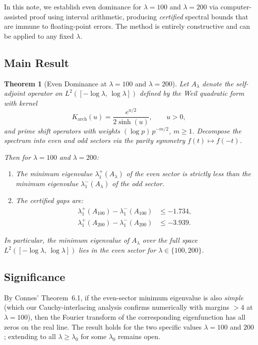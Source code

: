 \documentclass[12pt,a4paper]{article}
\newtheorem{theorem}{Theorem}[section]
\theoremstyle{definition}
\theoremstyle{remark}
\begin{document}
In this note, we establish even dominance for $\lambda = 100$ and $\lambda = 200$ via computer-assisted proof using interval arithmetic, producing \emph{certified} spectral bounds that are immune to floating-point errors. The method is entirely constructive and can be applied to any fixed $\lambda$.

\subsection{Main Result}

\begin{theorem}[Even Dominance at $\lambda = 100$ and $\lambda = 200$]
\label{thm:main}
Let $A_\lambda$ denote the self-adjoint operator on $L^2([-\log\lambda,\,\log\lambda])$ defined by the Weil quadratic form with kernel
\[
  K_{\mathrm{arch}}(u) = \frac{e^{u/2}}{2\sinh(u)}, \qquad u > 0,
\]
and prime shift operators with weights $(\log p)\,p^{-m/2}$, $m \geq 1$. Decompose the spectrum into even and odd sectors via the parity symmetry $f(t) \mapsto f(-t)$.

Then for $\lambda = 100$ and $\lambda = 200$:
\begin{enumerate}[label=(\roman*)]
  \item The minimum eigenvalue $\lambda_1^+(A_\lambda)$ of the even sector is strictly less than the minimum eigenvalue $\lambda_1^-(A_\lambda)$ of the odd sector.
  \item The certified gaps are:
  \begin{align*}
    \lambda_1^+(A_{100}) - \lambda_1^-(A_{100}) &\leq -1.734, \\
    \lambda_1^+(A_{200}) - \lambda_1^-(A_{200}) &\leq -3.939.
  \end{align*}
\end{enumerate}
In particular, the minimum eigenvalue of $A_\lambda$ over the full space $L^2([-\log\lambda,\,\log\lambda])$ lies in the even sector for $\lambda \in \{100, 200\}$.
\end{theorem}

\subsection{Significance}

By Connes' Theorem~6.1, if the even-sector minimum eigenvalue is also \emph{simple} (which our Cauchy-interlacing analysis confirms numerically with margins $> 4$ at $\lambda = 100$), then the Fourier transform of the corresponding eigenfunction has all zeros on the real line. The result holds for the two specific values $\lambda = 100$ and $200$; extending to all $\lambda \geq \lambda_0$ for some $\lambda_0$ remains open.
\end{document}
